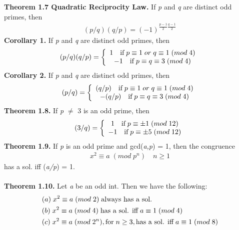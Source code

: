 \documentclass[a4paper,10pt]{article}
\begin{document}
\textbf{Theorem 1.7 Quadratic Reciprocity Law.} If \textit{p} and \textit{q} are distinct odd primes, then
\begin{align}
(p/q)(q/p) = (-1)^{\frac{p-1}{2}\frac{q-1}{2}}
\end{align}
\textbf{Corollary 1.} If \textit{p} and \textit{q} are distinct odd primes, then 
\begin{align}
(p/q)(q/p) = \left \{ \begin{array}{cc} 1 \quad \textnormal{if} \; p \equiv 1 \; or \; q \equiv 1 \; (mod \; 4) \\ -1 \quad \textnormal{if} \; p \equiv q \equiv 3 \; (mod \; 4)\end{array} \right.
\end{align}
\textbf{Corollary 2.} If \textit{p} and \textit{q} are distinct odd primes, then 
\begin{align}
(p/q) = \left \{ \begin{array}{cc} (q/p) \quad \textnormal{if} \; p \equiv 1 \; or \; q \equiv 1 \; (mod \; 4) \\ -(q/p) \quad \textnormal{if} \; p \equiv q \equiv 3 \; (mod \; 4)\end{array} \right.
\end{align}
\textbf{Theorem 1.8.} If \textit{p} $\neq$ 3 is an odd prime, then
\begin{align}
(3/q) = \left \{ \begin{array}{cc} 1 \quad \textnormal{if} \; p \equiv \pm 1 \; (mod \; 12) \\ -1 \quad \textnormal{if} \; p \equiv \pm 5 \; (mod \; 12)\end{array} \right.
\end{align}
\textbf{Theorem 1.9.} If \textit{p} is an odd prime and gcd(\textit{a,p}) = 1, then the congruence
\begin{align}
x^{2} \equiv a \; (mod \; p^{n}) \quad n \geq 1 
\end{align}
has a sol. iff (\textit{a/p}) = 1. \\ \\ 
\textbf{Theorem 1.10.} Let \textit{a} be an odd int. Then we have the following:
\begin{align}
&(a) \; x^{2} \equiv a \; (mod \; 2) \; \textnormal{always has a sol.} \\
&(b) \; x^{2} \equiv a \; (mod \; 4) \; \textnormal{has a sol. iff} \; a \equiv 1 \; (mod \; 4) \\
&(c) \; x^{2} \equiv a \; (mod \; 2^{n}), \textnormal{for} \; n\geq 3, \textnormal{has a sol. iff} \; a \equiv 1 \; (mod \; 8)
\end{align} \
\end{document}
